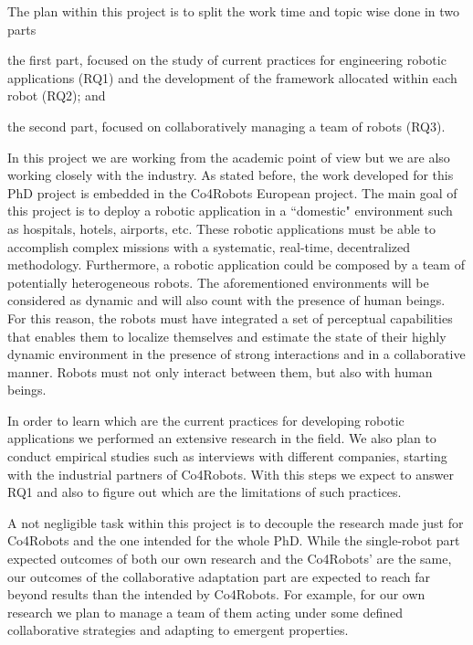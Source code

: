 The plan within this project is to split the work time and topic wise done  in two parts
\begin{enumerate*}
\item the first part, focused on the study of current practices for engineering robotic applications (RQ1) and the development of the framework allocated within each robot (RQ2); and
\item the second part, focused on collaboratively managing a team of robots (RQ3).
\end{enumerate*}

In this project we are working from the academic point of view but we are also working closely with the industry.
As stated before, the work developed for this PhD project is embedded in the Co4Robots European project.
The main goal of this project is to deploy a robotic application in a ``domestic" environment such as hospitals, hotels, airports, etc.
These robotic applications must be able to accomplish complex missions with a systematic, real-time, decentralized methodology.
Furthermore, a robotic application could be composed by a team of potentially heterogeneous robots.
The aforementioned environments will be considered as dynamic and will also count with the presence of human beings.
For this reason, the robots must have integrated a set of perceptual capabilities that enables them to localize themselves and estimate the state of their highly dynamic environment in the presence of strong interactions and in a collaborative manner.
Robots must not only interact between them, but also with human beings.

In order to learn which are the current practices for developing robotic applications we performed an extensive research in the field.
We also plan to conduct empirical studies such as interviews with different companies, starting with the industrial partners of Co4Robots.
With this steps we expect to answer RQ1 and also to figure out which are the limitations of such practices.  

A not negligible task within this project is to decouple the research made just for Co4Robots and the one intended for the whole PhD.
While the single-robot part expected outcomes of both our own research and the Co4Robots' are the same, our outcomes of the collaborative adaptation part are expected to reach far beyond results than the intended by Co4Robots.
For example, for our own research we plan to manage a team of them acting under some defined collaborative strategies and adapting to emergent properties.



